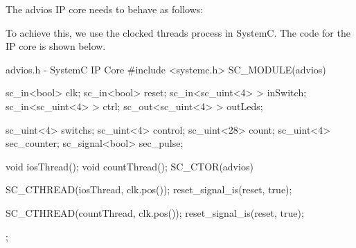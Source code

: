 \documentclass[../main.tex]{subfiles}
\begin{document}
\noindent The advios IP core needs to behave as follows:
\par
{}
To achieve this, we use the clocked threads process in SystemC. The code for the IP core is shown below.
\begin{myminted}{advios.h - SystemC IP Core}
    #include <systemc.h>
    SC_MODULE(advios){
        sc_in<bool> clk;
        sc_in<bool> reset;
        sc_in<sc_uint<4> > inSwitch;
        sc_in<sc_uint<4> > ctrl;
        sc_out<sc_uint<4> > outLeds;
    
        sc_uint<4> switchs;
        sc_uint<4> control;
        sc_uint<28> count;
        sc_uint<4> sec_counter;
        sc_signal<bool> sec_pulse;
    
        void iosThread();
        void countThread();
        SC_CTOR(advios){
            SC_CTHREAD(iosThread, clk.pos());
            reset_signal_is(reset, true);
    
            SC_CTHREAD(countThread, clk.pos());
            reset_signal_is(reset, true);
        }
    };
\end{myminted}
\end{document}
